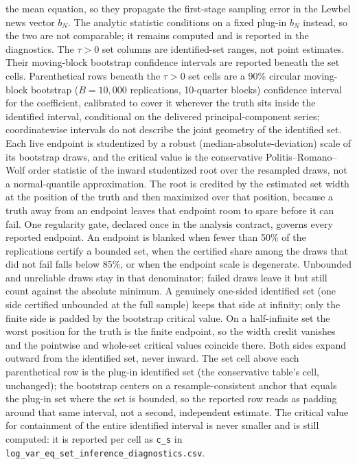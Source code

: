 \documentclass[11pt]{article}
\begin{document}
\begin{table}[!htbp]
\begin{threeparttable}
\begin{tablenotes}[flushleft]
the mean equation, so they propagate the first-stage sampling error in the Lewbel news vector $b_N$. The analytic statistic conditions on a fixed plug-in $b_N$ instead, so the two are not comparable; it remains computed and is reported in the diagnostics. The $\tau{>}0$ set columns are identified-set ranges, not point estimates. Their moving-block bootstrap confidence intervals are reported beneath the set cells. Parenthetical rows beneath the $\tau{>}0$ set cells are a 90\% circular moving-block bootstrap ($B=10{,}000$ replications, 10-quarter blocks) confidence interval for the coefficient, calibrated to cover it wherever the truth sits inside the identified interval, conditional on the delivered principal-component series; coordinatewise intervals do not describe the joint geometry of the identified set. Each live endpoint is studentized by a robust (median-absolute-deviation) scale of its bootstrap draws, and the critical value is the conservative Politis--Romano--Wolf order statistic of the inward studentized root over the resampled draws, not a normal-quantile approximation. The root is credited by the estimated set width at the position of the truth and then maximized over that position, because a truth away from an endpoint leaves that endpoint room to spare before it can fail. One regularity gate, declared once in the analysis contract, governs every reported endpoint. An endpoint is blanked when fewer than 50\% of the replications certify a bounded set, when the certified share among the draws that did not fail falls below 85\%, or when the endpoint scale is degenerate. Unbounded and unreliable draws stay in that denominator; failed draws leave it but still count against the absolute minimum. A genuinely one-sided identified set (one side certified unbounded at the full sample) keeps that side at infinity; only the finite side is padded by the bootstrap critical value. On a half-infinite set the worst position for the truth is the finite endpoint, so the width credit vanishes and the pointwise and whole-set critical values coincide there. Both sides expand outward from the identified set, never inward. The set cell above each parenthetical row is the plug-in identified set (the conservative table's cell, unchanged); the bootstrap centers on a resample-consistent anchor that equals the plug-in set where the set is bounded, so the reported row reads as padding around that same interval, not a second, independent estimate. The critical value for containment of the entire identified interval is never smaller and is still computed: it is reported per cell as \texttt{c\_s} in \texttt{log\_var\_eq\_set\_inference\_diagnostics.csv}.
\end{tablenotes}
\end{threeparttable}
\end{table}
\end{document}
